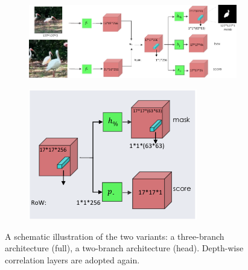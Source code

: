 \begin{figure}[t]
    \centering
    \begin{subfigure}[b]{0.68\textwidth}
        \centering
        \includegraphics[width=\textwidth]{figures/theoretical_foundations/siam_mask_architecture_3_branch.pdf}
        \caption[]{}
    \end{subfigure}
    \hfill
    \begin{subfigure}[b]{0.31\textwidth}
        \centering
        \includegraphics[width=\textwidth]{figures/theoretical_foundations/siam_mask_architecture_2_branch_head.pdf}
        \caption[]{}
    \end{subfigure}
    \caption[ architecture]{A schematic illustration of the two  variants:  a three-branch architecture (full),  a two-branch architecture (head). Depth-wise correlation layers are adopted again. }
    \label{fig:SiamMaskArchitecture}
\end{figure}

